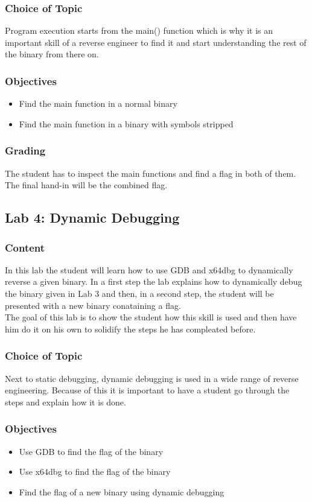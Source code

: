 \subsubsection*{Choice of Topic}
Program execution starts from the main() function which is why it is an important skill of a reverse engineer to find it and start understanding the rest of the binary from there on.
\subsubsection*{Objectives}
\begin{itemize}
    \item Find the main function in a normal binary
    \item Find the main function in a binary with symbols stripped
\end{itemize}
\subsubsection*{Grading}
The student has to inspect the main functions and find a flag in both of them. The final hand-in will be the combined flag.

\subsection{Lab 4: Dynamic Debugging}
\subsubsection*{Content}
In this lab the student will learn how to use GDB and x64dbg to dynamically reverse a given binary. In a first step the lab explains how to dynamically debug the binary given in Lab 3 and then, in a second step, the student will be presented with a new binary conataining a flag. \\
The goal of this lab is to show the student how this skill is used and then have him do it on his own to solidify the steps he has compleated before.
\subsubsection*{Choice of Topic}
Next to static debugging, dynamic debugging is used in a wide range of reverse engineering. Because of this it is important to have a student go through the steps and explain how it is done. 
\subsubsection*{Objectives}
\begin{itemize}
    \item Use GDB to find the flag of the binary
    \item Use x64dbg to find the flag of the binary
    \item Find the flag of a new binary using dynamic debugging
\end{itemize}
